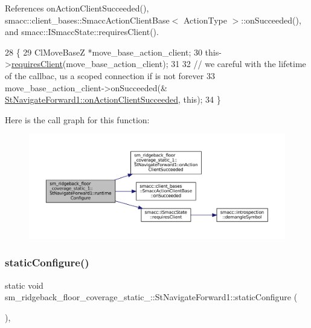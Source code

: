 References on\+Action\+Client\+Succeeded(), smacc\+::client\+\_\+bases\+::\+Smacc\+Action\+Client\+Base$<$ Action\+Type $>$\+::on\+Succeeded(), and smacc\+::\+I\+Smacc\+State\+::requires\+Client().


\begin{DoxyCode}
28     \{
29       ClMoveBaseZ *move\_base\_action\_client;
30       this->\hyperlink{classsmacc_1_1ISmaccState_a7f95c9f0a6ea2d6f18d1aec0519de4ac}{requiresClient}(move\_base\_action\_client);
31 
32       \textcolor{comment}{// we careful with the lifetime of the callbac, us a scoped connection if is not forever}
33       move\_base\_action\_client->onSucceeded(&
      \hyperlink{structsm__ridgeback__floor__coverage__static__1_1_1StNavigateForward1_ac459cf53276a9d78e6c40627c47a5e67}{StNavigateForward1::onActionClientSucceeded}, \textcolor{keyword}{this});
34     \}
\end{DoxyCode}
Here is the call graph for this function\+:
\nopagebreak
\begin{figure}[H]
\begin{center}
\leavevmode
\includegraphics[width=350pt]{structsm__ridgeback__floor__coverage__static__1_1_1StNavigateForward1_a5c06e290228ff7469666822fa041d767_cgraph}
\end{center}
\end{figure}
\mbox{\label{structsm__ridgeback__floor__coverage__static__1_1_1StNavigateForward1_afd6911c319690c06ce390268bd4ae566}} 
\subsubsection{\texorpdfstring{static\+Configure()}{staticConfigure()}}
{\footnotesize\ttfamily static void sm\+\_\+ridgeback\+\_\+floor\+\_\+coverage\+\_\+static\+\_\+::\+St\+Navigate\+Forward1\+::static\+Configure (\begin{DoxyParamCaption}{ }\end{DoxyParamCaption})\hspace{0.3cm}{\ttfamily [inline]}, {\ttfamily [static]}}



